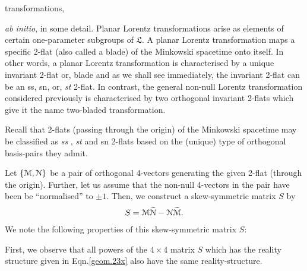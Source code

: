 transformations, {\textsl{ab initio}, in some detail. 
Planar Lorentz transformations arise as elements of 
certain one-parameter subgroups of   $\mathfrak{L}$. A 
planar Lorentz transformation maps a specific 2-flat 
(also called a blade) of the Minkowski spacetime onto 
itself. In other words, a planar Lorentz 
transformation is characterised by a unique invariant 
2-flat or, blade and as we shall see immediately, the 
invariant 2-flat can be an ss, sn, or, \textsl{st} 
2-flat. In contrast, the general non-null Lorentz 
transformation considered previously is characterised 
by two orthogonal invariant 2-flats which give it the 
name {two-bladed transformation}.

 Recall that 
2-flats  (passing  thro\break ugh the origin) of the 
Minkowski spacetime may be classified as   \textsl{ss} 
, \textsl{st} and sn 2-flats based on the  (unique) 
type of orthogonal basis-pairs they 
admit.

Let $\{\EuScript{M}, \EuScript{N}\}$ be a pair of 
orthogonal 4-vectors generating the given 2-flat 
(through the origin). Further, let us assume that the 
non-null 4-vectors in the pair have been be 
``normalised'' to  $ \pm 1$. Then, we construct a 
skew-symmetric matrix $S$ by 
\begin{align}\label{geom.68} S=\EuScript{M} 
\tilde{\EuScript{N}} 
-\EuScript{N}\tilde{\EuScript{M}}. \end{align} We note 
the following properties of this skew-symmetric matrix 
$S$: 

 First, we 
observe that all powers of the $4\times 4$ matrix $S$ 
which has the reality structure given in 
Eqn.\eqref{geom.23x} also have the {same} 
reality-structure.

}
